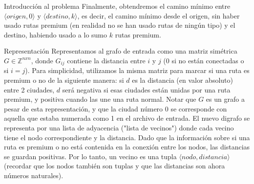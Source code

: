 \begin{subsection}{Introducción al problema}
Finalmente, obtendremos el camino m\'{i}nimo entre $\langle origen, 0 \rangle$ y $\langle destino, k \rangle$, es decir, el camino m\'{i}nimo desde el origen, sin haber usado rutas premium (en realidad no se han usado rutas de ning\'{u}n tipo) y el destino, habiendo usado a lo sumo $k$ rutas premium. 
\end{subsection}


\begin{subsection}{Representaci\'{o}n}
Representamos al grafo de entrada como una matriz sim\'{e}trica $G \in \mathbb{Z}^{nxn}$, donde $G_{ij}$ contiene la distancia entre $i$ y $j$ (0 si no están conectadas o si $i=j$).  Para simplicidad, utilizamos la misma matriz para marcar si una ruta es premium o no de la siguiente manera: si $d$ es la distancia (en valor absoluto) entre 2 ciudades, $d$ será negativa si esas ciudades est\'{a}n unidas por una ruta premium, y positiva cuando las une una ruta normal. Notar que $G$ es un grafo a pesar de esta representaci\'{o}n, y que la ciudad n\'{u}mero 0 se corresponde con aquella que estaba numerada como 1 en el archivo de entrada.
El nuevo digrafo se representa por una lista de adyacencia ("lista de vecinos") donde cada vecino tiene el nodo correspondiente y la distancia. Dado que la información sobre si una ruta es premium o no está contenida en la conexión entre los nodos, las distancias se guardan positivas. Por lo tanto, un vecino es una tupla $\langle nodo, distancia \rangle$ (recordar que los nodos también son tuplas y que las distancias son ahora números naturales).
\end{subsection}

